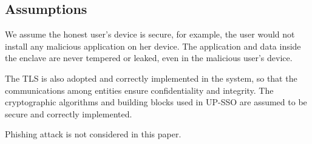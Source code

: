 \subsection{Assumptions}
We assume the honest user's device is secure, for example, the user would not install any malicious application on her device. The application and data inside the enclave are never tempered or leaked, even in the malicious user's device.

The TLS is also adopted and correctly implemented in the system, so that the communications among entities ensure confidentiality and integrity.
The cryptographic algorithms and building blocks used in UP-SSO are assumed to be secure and correctly implemented. 

Phishing attack is not considered in this paper.

